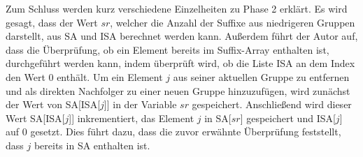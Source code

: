 Zum Schluss werden kurz verschiedene Einzelheiten zu Phase 2 erklärt. 
Es wird gesagt, dass der Wert $sr$, welcher die Anzahl der Suffixe aus niedrigeren Gruppen darstellt, aus SA und ISA berechnet werden kann. 
Außerdem führt der Autor auf, dass die Überprüfung, ob ein Element bereits im Suffix-Array enthalten ist, durchgeführt werden kann, indem überprüft wird, ob die Liste ISA an dem Index den Wert 0 enthält. 
Um ein Element $j$ aus seiner aktuellen Gruppe zu entfernen und als direkten Nachfolger zu einer neuen Gruppe hinzuzufügen, wird zunächst der Wert von SA[ISA[$j$]] in der Variable $sr$ gespeichert. 
Anschließend wird dieser Wert SA[ISA[$j$]] inkrementiert, das Element $j$ in SA[$sr$] gespeichert und ISA[$j$] auf 0 gesetzt. 
Dies führt dazu, dass die zuvor erwähnte Überprüfung feststellt, dass $j$ bereits in SA enthalten ist.
